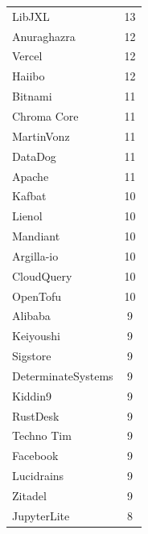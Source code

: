 \documentclass[conference]{IEEEtran}
\begin{document}
\begin{table}[!h]
\begin{tabular}{|l|c|}
              LibJXL & 13 \\
              Anuraghazra & 12 \\
              Vercel & 12 \\
              Haiibo & 12 \\
              Bitnami & 11 \\
              Chroma Core & 11 \\
              MartinVonz & 11 \\
              DataDog & 11 \\
              Apache & 11 \\
              Kafbat & 10 \\
              Lienol & 10 \\
              Mandiant & 10 \\
              Argilla-io & 10 \\
              CloudQuery & 10 \\
              OpenTofu & 10 \\
              Alibaba & 9 \\
              Keiyoushi & 9 \\
              Sigstore & 9 \\
              DeterminateSystems & 9 \\
              Kiddin9 & 9 \\
              RustDesk & 9 \\
              Techno Tim & 9 \\
              Facebook & 9 \\
              Lucidrains & 9 \\
              Zitadel & 9 \\
              JupyterLite & 8 \\
              \hline
          \end{tabular}
      \end{table}
\end{document}
